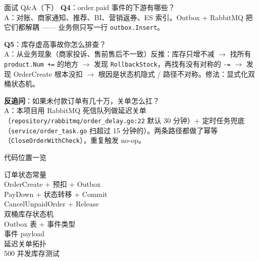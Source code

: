 \begin{frame}{面试 Q\&A（下）}
\textbf{Q4}：order.paid 事件的下游有哪些？\\
\hspace{4mm}\small A：对账、商家通知、推荐、BI、营销返券、ES 索引。Outbox + RabbitMQ 把它们都解耦 —— 业务侧只写一行 \texttt{outbox.Insert}。

\vspace{2mm}
\textbf{Q5}：库存虚高事故你怎么排查？\\
\hspace{4mm}\small A：从业务现象（商家投诉、售前售后不一致）反推：库存只增不减 $\to$ 找所有 \texttt{product.Num +=} 的地方 $\to$ 发现 \texttt{RollbackStock}，再找有没有对称的 \texttt{-=} $\to$ 发现 OrderCreate 根本没扣 $\to$ 根因是状态机隐式 / 路径不对称。修法：显式化双桶状态机。

\vspace{2mm}
\textbf{反追问}：如果未付款订单有几十万，关单怎么扛？\\
\hspace{4mm}\small A：本项目用 RabbitMQ 死信队列做延迟关单（\texttt{repository/rabbitmq/order\_delay.go:22} 默认 30 分钟）+ 定时任务兜底（\texttt{service/order\_task.go} 扫超过 15 分钟的）。两条路径都做了幂等（\texttt{CloseOrderWithCheck}），重复触发 no-op。
\end{frame}

\begin{frame}{代码位置一览}
\begin{description}
  \item[订单状态常量]
  \item[OrderCreate + 预扣 + Outbox]
  \item[PayDown + 状态转移 + Commit]
  \item[CancelUnpaidOrder + Release]
  \item[双桶库存状态机]
  \item[Outbox 表 + 事件类型]
  \item[事件 payload]
  \item[延迟关单拓扑]
  \item[500 并发库存测试]
\end{description}
\vspace{1mm}
\end{frame}


